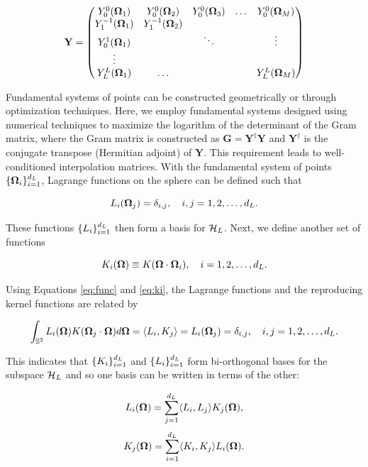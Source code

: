 \begin{equation}
\mathbf{Y} =
\begin{pmatrix}
Y_0^0(\mathbf\Omega_1) & Y_0^0(\mathbf\Omega_2) & Y_0^0(\mathbf\Omega_3) & \ldots & Y_0^0(\mathbf\Omega_{M})\\ 
Y_1^{-1}(\mathbf\Omega_1) & Y_1^{-1}(\mathbf\Omega_2) &  &  & \\ 
Y_0^1(\mathbf\Omega_1) &  & \ddots &  & \vdots \\ 
\vdots &  &  &  & \\ 
Y_L^L(\mathbf\Omega_1) & \ldots &  &  & Y_L^L(\mathbf\Omega_{M})
\end{pmatrix}
\label{yinterp}
\end{equation}

Fundamental systems of points can be constructed geometrically or through optimization
techniques. Here, we employ fundamental systems designed using numerical techniques to
maximize the logarithm of the determinant of the Gram matrix, where the Gram matrix is
constructed as $\mathbf{G} = \mathbf{Y}^\dagger\mathbf{Y}$ and $\mathbf{Y}^\dagger$ 
is the conjugate transpose (Hermitian adjoint) of $\mathbf{Y}$. This 
requirement leads to 
well-conditioned interpolation matrices. With the fundamental system of points 
$\{\mathbf\Omega_i\}_{i=1}^{d_L}$, Lagrange functions on the sphere can be defined such that

\begin{equation}
L_i(\mathbf\Omega_j) = \delta_{i,j}, \quad i,j = 1,2,\ldots,d_L.
\end{equation}

\noindent These functions $\{L_i\}_{i=1}^{d_L}$ then form a basis for $\mathcal{H}_L$. Next, we
define another set of functions

\begin{equation}
K_i(\mathbf\Omega) \equiv K(\mathbf\Omega\cdot\mathbf\Omega_i), \quad i = 1,2,\ldots,d_L.
\label{eq:ki}
\end{equation}

\noindent Using Equations \ref{eq:func} and \ref{eq:ki}, the Lagrange functions and 
the reproducing kernel functions are related by

\begin{equation}
\int_{\mathbb{S}^2}L_i(\mathbf\Omega)K(\mathbf\Omega_j\cdot\mathbf\Omega)d\mathbf\Omega = \langle L_i,K_j\rangle = L_i(\mathbf\Omega_j) = 
\delta_{i,j}, \quad i,j = 1,2,\ldots,d_L.
\end{equation}

\noindent This indicates that $\{K_i\}_{i=1}^{d_L}$ and $\{L_i\}_{i=1}^{d_L}$ form 
bi-orthogonal bases for the subspace $\mathcal{H}_L$ and so one basis can be written in terms of
the other:

\begin{equation}
L_i(\mathbf\Omega) = \sum_{j=1}^{d_L} \langle L_i,L_j \rangle K_j(\mathbf\Omega),
\label{eq:li}
\end{equation}
\begin{equation}
K_j(\mathbf\Omega) = \sum_{i=1}^{d_L} \langle K_i,K_j \rangle L_i(\mathbf\Omega).
\label{eq:kj}
\end{equation}

